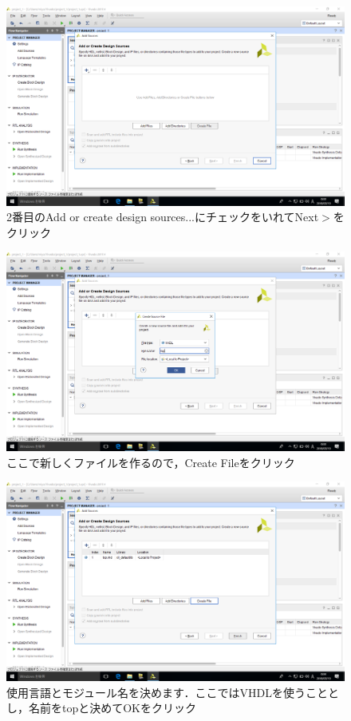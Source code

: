 \documentclass[a4paper,dvipdfmx]{jsarticle}
\begin{document}
 \begin{figure}[H]
  \begin{center}
   \includegraphics[width=.8\textwidth]{chapter03_figures/VirtualBox_Windows10_19_03_2018_00_03_42.png}
  \end{center}
  \caption{2番目のAdd or create design sources...にチェックをいれてNext$\gt$をクリック}
 \end{figure}

 \begin{figure}[H]
  \begin{center}
   \includegraphics[width=.8\textwidth]{chapter03_figures/VirtualBox_Windows10_19_03_2018_00_03_54.png}
  \end{center}
  \caption{ここで新しくファイルを作るので，Create Fileをクリック}
 \end{figure}

 \begin{figure}[H]
  \begin{center}
   \includegraphics[width=.8\textwidth]{chapter03_figures/VirtualBox_Windows10_19_03_2018_00_04_01.png}
  \end{center}
  \caption{使用言語とモジュール名を決めます．ここではVHDLを使うこととし，名前をtopと決めてOKをクリック}
 \end{figure}
\end{document}
